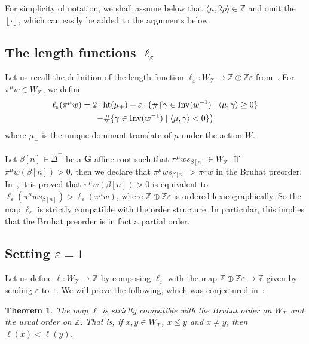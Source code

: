\documentclass[10pt]{amsart}
\newtheorem{theo}{Theorem}[section]
\newcommand{\floor}[1]{\left\lfloor #1 \right\rfloor}
\newcommand{\eps}{\varepsilon}\newcommand{\ZZ}{\mathbb{Z}}\newcommand{\QQ}{\mathbb{Q}}\newcommand{\RR}{\mathbb{R}}\newcommand{\bB}{\mathbf{B}}\newcommand{\bG}{\mathbf{G}}\newcommand{\cO}{\mathcal{O}}\newcommand{\cS}{\mathcal{S}}\newcommand{\cT}{\mathcal{T}}\newcommand{\WTits}{W_{\cT}}\newcommand{\TitsCone}{\cT}\newcommand{\betacheck}{\beta^\vee}\newcommand{\Inv}{\operatorname{Inv}}\newcommand{\height}{\operatorname{ht}}\newcommand{\im}{\operatorname{image}}\newcommand{\sgn}{\operatorname{sgn}}\newcommand{\tDelta}{\widetilde{\Delta}}\newcommand{\Invplusplusx}{\Inv^{++}_x}\newcommand{\tr}{\widetilde{r}}\newcommand{\tn}{\widetilde{n}}\newcommand{\fl}{\mathfrak{l}}\newcommand{\fs}{\mathfrak{s}}\newcommand{\mk}{\mkern -1mu}\newcommand{\Mk}{\mkern -2mu}\newcommand{\mK}{\mkern 1mu}\newcommand{\MK}{\mkern 2mu}
\begin{document}
For simplicity of notation, we shall assume below that $\langle \mu, 2\rho\rangle \in \ZZ$ and omit the $\floor{\cdot}$, which can easily be added to the arguments below.

\subsection{The length functions \texorpdfstring{$\ell_\eps$}{ell eps}}\label{sec:length-functions-and-the-conjecture}

Let us recall the definition of the length function $\ell_\varepsilon : \WTits \rightarrow \ZZ \oplus \ZZ \varepsilon$ from~\cite{M}. For $\pi^\mu w \in \WTits$, we define
\begin{multline}
\ell_\varepsilon (\pi^\mu w) = 2 \cdot \height(\mu_+) + \varepsilon \cdot \big(\# \{ \gamma \in \Inv(w^{-1}) \suchthat \langle \mu,\gamma \rangle \geq 0 \}
\\ 
- \# \{ \gamma \in \Inv(w^{-1}) \suchthat \langle \mu,\gamma \rangle < 0 \} \big)
\end{multline}
where $\mu_+$ is the unique dominant translate of $\mu$ under the action $W$.

Let $\beta[n]\in\tDelta^+$ be a $\bG$-affine root such that $\pi^\mu w s_{\beta[n]} \in \WTits$. If $\pi^\mu w(\beta[n]) > 0$, then we declare that $\pi^\mu w s_{\beta[n]} > \pi^\mu w$ in the Bruhat preorder. In~\cite{M}, it is proved that $\pi^\mu w(\beta[n]) > 0$ is equivalent to $\ell_\varepsilon(\pi^\mu w s_{\beta[n]}) > \ell_\varepsilon(\pi^\mu w) $, where $\ZZ \oplus \ZZ \varepsilon$ is ordered lexicographically. So the map $\ell_\varepsilon$ is strictly compatible with the order structure. In particular, this implies that the Bruhat preorder is in fact a partial order.

\subsection{Setting \texorpdfstring{$\varepsilon = 1$}{varepsilon = 1}}

Let us define $\ell : \WTits \rightarrow \ZZ$ by composing $\ell_\varepsilon$ with the map $\ZZ \oplus \ZZ \varepsilon \rightarrow \ZZ$ given by sending $\varepsilon$ to $1$. We will prove the following, which was conjectured in~\cite{M}:

\begin{theo}\label{thm:compatibility-of-ell-with-order}
The map $\ell$ is strictly compatible with the Bruhat order on $\WTits$ and the usual order on $\ZZ$. That is, if $x,y \in \WTits$, $x \leq y$ and $x \neq y$, then $\ell(x) < \ell(y)$.
\end{theo}
\end{document}
